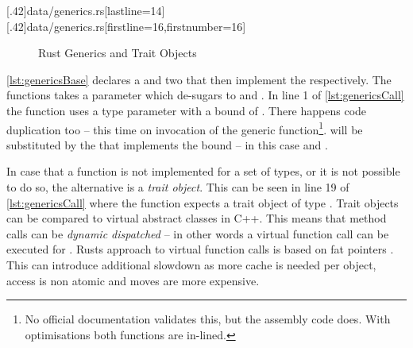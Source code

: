 \documentclass[thesis]{subfiles}
\begin{document}
    \LstTikzBox{\genericsBase}[.42\linewidth]{data/generics.rs}[lastline=14]
    \LstTikzBox{\genericsCall}[.42\linewidth]{data/generics.rs}[firstline=16,firstnumber=16]
    \begin{figure}[ht]
      \captionsetup{type=lstlisting}
       \hfill%
      \caption{Rust Generics and Trait Objects}\label{lst:generics}
    \end{figure}

    \autoref{lst:genericsBase} declares a \trait and two \structs that then implement the \trait respectively.
    The functions  takes a parameter  which de-sugars to  and .
    In line 1 of \autoref{lst:genericsCall} the function  uses a type parameter \T with a bound of .
    There happens code duplication too -- this time on invocation of the generic function\footnote{
      No official documentation validates this, but the assembly code does. With optimisations both functions are in-lined.
    }.
    \T will be substituted by the \struct that implements the bound -- in this case  and .

    In case that a function is not implemented for a set of types, or it is not possible to do so, the alternative is a \emph{trait object}\autocite[17. Object Oriented Programming Features of Rust]{rust-book}.
    This can be seen in line 19 of \autoref{lst:genericsCall} where the function expects a trait object of type .
    Trait objects can be compared to virtual abstract classes in C++.
    This means that method calls can be \emph{dynamic dispatched} -- in other words a virtual function call can be executed for .
    Rusts approach to virtual function calls is based on fat pointers \autocites[std::raw::TraitObject]{rust-doc}[Trait Objects]{rust-book1}.
    This can introduce additional slowdown as more cache is needed per object, access is non atomic\autocite[8.2.3.1 ff.]{intel64and} and moves are more expensive.
\end{document}
